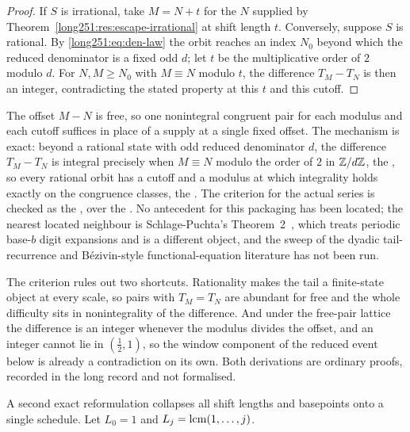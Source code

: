 \documentclass[11pt]{article}
\begin{document}
\begin{proof}
If $S$ is irrational, take $M=N+t$ for the $N$ supplied by
Theorem~\ref{long251:res:escape-irrational} at shift length $t$.  Conversely, suppose
$S$ is rational.  By \eqref{long251:eq:den-law} the orbit reaches an index $N_0$ beyond
which the reduced denominator is a fixed odd $d$; let $t$ be the
multiplicative order of $2$ modulo $d$.  For $N,M\ge N_0$ with $M\equiv N$
modulo $t$, the difference $T_M-T_N$ is then an integer, contradicting the
stated property at this $t$ and this cutoff.
\end{proof}

\noindent The offset $M-N$ is free, so one nonintegral congruent pair for each
modulus and each cutoff suffices in place of a supply at a single fixed offset.
The mechanism is exact: beyond a rational state with odd reduced denominator
$d$, the difference $T_M-T_N$ is integral precisely when $M\equiv N$ modulo the
order of $2$ in $\mathbb{Z}/d\mathbb{Z}$, the
, so every rational orbit has a cutoff and a modulus at which
integrality holds exactly on the congruence classes, the
.  The criterion for the actual series is checked as the
, over the
.  No antecedent for this packaging has been located; the
nearest located neighbour is Schlage-Puchta's
Theorem~2~\cite{schlagepuchta2011}, which treats periodic base-$b$ digit
expansions and is a different object, and the sweep of the dyadic
tail-recurrence and B\'ezivin-style functional-equation literature has not been
run.

The criterion rules out two shortcuts.  Rationality makes the tail a
finite-state object at every scale, so pairs with $T_M=T_N$ are abundant for
free and the whole difficulty sits in nonintegrality of the difference.  And
under the free-pair lattice the difference is an integer whenever the modulus
divides the offset, and an integer cannot lie in $(\tfrac12,1)$, so the window
component of the reduced event below is already a contradiction on its own.
Both derivations are ordinary proofs, recorded in the long record and not
formalised.

A second exact reformulation collapses all shift lengths and basepoints onto a
single schedule.  Let $L_0=1$ and $L_j=\operatorname{lcm}(1,\ldots,j)$.
\end{document}
